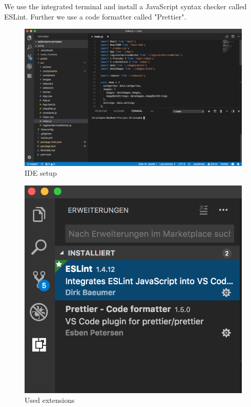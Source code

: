 We use the integrated terminal and install a JavaScript syntax checker called ESLint. 
Further we use a code formatter called "Prettier". 

\begin{figure}[H]
	\centering
	\includegraphics[width=\linewidth]{bilder/cyto/IDE.png}
	\caption{IDE setup}
	\label{fig:IDE}
\end{figure}

\begin{figure}[H]
	\centering
	\includegraphics[scale=0.5]{bilder/cyto/LINT.png}
	\caption{Used extensions}
	\label{fig:Extensions}
\end{figure}

